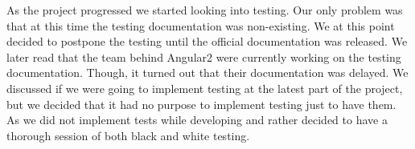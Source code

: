 \par
As the project progressed we started looking into testing. Our only problem was that at this time the testing documentation was non-existing. We at this point decided to postpone the testing until the official documentation was released. We later read that the team behind Angular2 were currently working on the testing documentation. Though, it turned out that their documentation was delayed. We discussed if we were going to implement testing at the latest part of the project, but we decided that it had no purpose to implement testing just to have them. As we did not implement tests while developing and rather decided to have a thorough session of both black and white testing.



